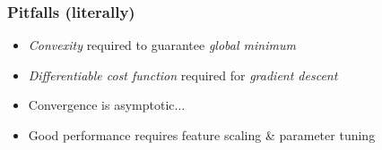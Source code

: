 \documentclass[xcolor={dvipsnames}]{beamer}
\begin{document}
\frame
{
\frametitle{Pitfalls (literally)}

\begin{figure}
\centering
{} 
\end{figure}

\vspace{-1em}

\begin{itemize}
\item<2-> \emph{Convexity} required to guarantee \emph{global minimum} 
\item<3-> \emph{Differentiable cost function} required for \emph{gradient descent}
\item<4-> Convergence is asymptotic...  
\item<5-> Good performance requires feature scaling \& parameter tuning 
\end{itemize}

}
\end{document}

